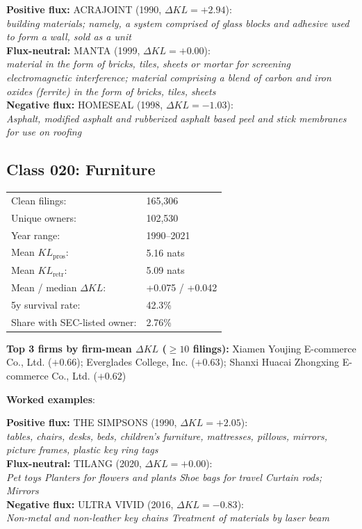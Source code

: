   \textbf{Positive flux:} \textsc{ACRAJOINT} (1990, $\Delta KL=+2.94$):\\
  \textit{building materials; namely, a system comprised of glass blocks and adhesive used to form a wall, sold as a unit}\\
  \textbf{Flux-neutral:} \textsc{MANTA} (1999, $\Delta KL=+0.00$):\\
  \textit{material in the form of bricks, tiles, sheets or mortar for screening electromagnetic interference; material comprising a blend of carbon and iron oxides (ferrite) in the form of bricks, tiles, sheets}\\
  \textbf{Negative flux:} \textsc{HOMESEAL} (1998, $\Delta KL=-1.03$):\\
  \textit{Asphalt, modified asphalt and rubberized asphalt based peel and stick membranes for use on roofing}\\

\subsection*{Class 020: Furniture}
\label{app:industry-020}

\begin{tabular}{ll}
Clean filings: & 165,306 \\
Unique owners: & 102,530 \\
Year range: & 1990--2021 \\
Mean $KL_\text{pros}$: & 5.16 nats \\
Mean $KL_\text{retr}$: & 5.09 nats \\
Mean / median $\Delta KL$: & +0.075 / +0.042 \\
5y survival rate: & 42.3\% \\
Share with SEC-listed owner: & 2.76\% \\
\end{tabular}

\textbf{Top 3 firms by firm-mean $\Delta KL$ ($\geq 10$ filings):} Xiamen Youjing E-commerce Co., Ltd. ($+0.66$); Everglades College, Inc. ($+0.63$); Shanxi Huacai Zhongxing E-commerce Co., Ltd. ($+0.62$)

\textbf{Worked examples}:

  \textbf{Positive flux:} \textsc{THE SIMPSONS} (1990, $\Delta KL=+2.05$):\\
  \textit{tables, chairs, desks, beds, children's furniture, mattresses, pillows, mirrors, picture frames, plastic key ring tags}\\
  \textbf{Flux-neutral:} \textsc{TILANG} (2020, $\Delta KL=+0.00$):\\
  \textit{Pet toys Planters for flowers and plants Shoe bags for travel Curtain rods; Mirrors}\\
  \textbf{Negative flux:} \textsc{ULTRA VIVID} (2016, $\Delta KL=-0.83$):\\
  \textit{Non-metal and non-leather key chains Treatment of materials by laser beam}\\


